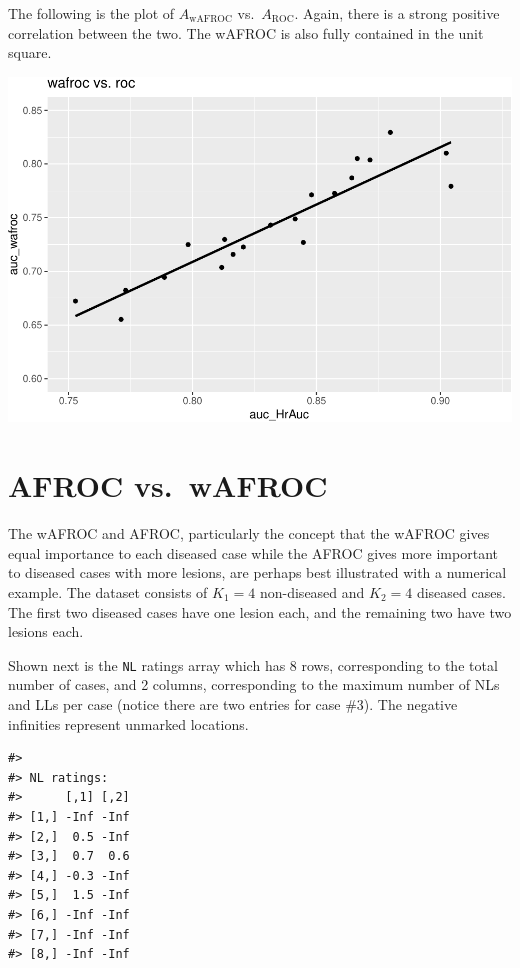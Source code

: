 \documentclass[
]{book}
\begin{document}
The following is the plot of \(A_{\text{wAFROC}}\) vs.~\(A_{\text{ROC}}\). Again, there is a strong positive correlation between the two. The wAFROC is also fully contained in the unit square.

\includegraphics{03-empirical_files/figure-latex/unnamed-chunk-21-1.pdf}

\hypertarget{empirical-numerical-illustration}{%
\section{AFROC vs.~wAFROC}\label{empirical-numerical-illustration}}

The wAFROC and AFROC, particularly the concept that the wAFROC gives equal importance to each diseased case while the AFROC gives more important to diseased cases with more lesions, are perhaps best illustrated with a numerical example. The dataset consists of \(K_1 = 4\) non-diseased and \(K_2 = 4\) diseased cases. The first two diseased cases have one lesion each, and the remaining two have two lesions each.

Shown next is the \texttt{NL} ratings array which has 8 rows, corresponding to the total number of cases, and 2 columns, corresponding to the maximum number of NLs and LLs per case (notice there are two entries for case \#3). The negative infinities represent unmarked locations.

\begin{verbatim}
#> 
#> NL ratings:
#>      [,1] [,2]
#> [1,] -Inf -Inf
#> [2,]  0.5 -Inf
#> [3,]  0.7  0.6
#> [4,] -0.3 -Inf
#> [5,]  1.5 -Inf
#> [6,] -Inf -Inf
#> [7,] -Inf -Inf
#> [8,] -Inf -Inf
\end{verbatim}
\end{document}
